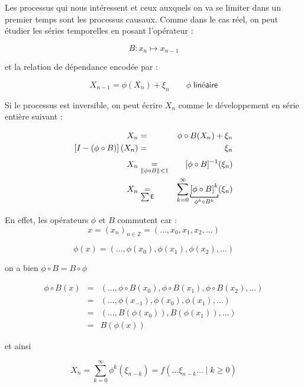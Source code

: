 \bigskip

Les processus qui nous intéressent et ceux auxquels on va se limiter dans un premier temps sont les processus causaux. Comme dans le cas réel, on peut étudier les séries temporelles en posant l'opérateur :

$$B : x_n \mapsto x_{n-1}$$

et la relation de dépendance encodée par :

$$X_{n-1} = \phi(X_n) + \xi_n \qquad \phi \; \textsf{linéaire}$$

Si le processus est inversible, on peut écrire $X_n$ comme le développement en série entière suivant :

\begin{align*}
    X_n                                  & =                                         & \phi \circ B(X_n) + \xi_n                                                                       \\
    \left[I - (\phi \circ B)\right](X_n) & \underset{\textsf{}} =                    & \xi_n
    \\
    X_n                                  & \underset{\Vert \phi \circ B \Vert < 1} = & \inverse{[\phi \circ B]} (\xi_n)
    \\
    X_n                                  & \underset{\sum \textsf{E}} =              & \sum\limits_{k=0}^\infty \underbracket[0.187ex]{\left[ \phi \circ B \right]^k}_{\phi^k \circ B^k}(\xi_n)
\end{align*}


En effet, les opérateurs $\phi$ et $B$ commutent car :
$$x = (x_n)_{n \in \mathds Z} = (\dots , x_0, x_1, x_2, \dots)$$

$$\phi(x) = (\dots , \phi(x_0), \phi(x_1), \phi(x_2), \dots)$$

on a bien $\phi \circ B = B \circ \phi$

\begin{align*}
    \phi \circ B(x) & = & (\dots , \phi \circ B(x_0), \phi \circ B(x_1), \phi \circ B(x_2), \dots)
    \\
                    & = & (\dots, \phi(x_{-1}), \phi(x_0), \phi(x_1), \dots)
    \\
                    & = & (\dots, B\left(\phi(x_0)\right) , B(\phi(x_1)),\dots)
    \\
                    & = & B\left( \phi(x) \right)
\end{align*}


et ainsi

$$
    \boxed{
        X_n = \sum\limits_{k=0}^\infty \phi^k( \xi_{n-k} ) = f( \dots \xi_{n-k} \dots \; | \; k \geq 0)
    }
$$
